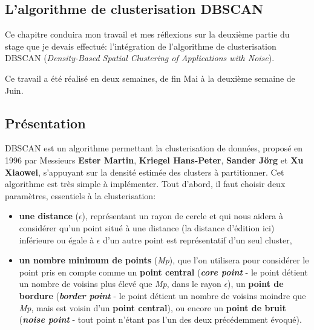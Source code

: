 \documentclass[pdftex,12pt,a4paper]{report}
\begin{document}
\begin{spacing}{1.2}
\chapter{L'algorithme de clusterisation DBSCAN}

Ce chapitre conduira mon travail et mes réflexions sur la deuxième partie du stage que je devais effectué: l'intégration de l'algorithme de clusterisation DBSCAN (\textit{Density-Based Spatial Clustering of Applications with Noise}).

Ce travail a été réalisé en deux semaines, de fin Mai à la deuxième semaine de Juin.

\section{Présentation}

DBSCAN est un algorithme permettant la clusterisation de données, proposé en 1996 par Messieurs \textbf{Ester Martin}, \textbf{Kriegel Hans-Peter}, \textbf{Sander Jörg} et \textbf{Xu Xiaowei}, s'appuyant sur la densité estimée des clusters à partitionner.
Cet algorithme est très simple à implémenter.
\newline
Tout d'abord, il faut choisir deux paramètres, essentiels à la clusterisation:
\begin{itemize}
\item{\textbf{une distance} ($\epsilon$), représentant un rayon de cercle et qui nous aidera à considérer qu'un point situé à une distance (la distance d'édition ici) inférieure ou égale à $\epsilon$ d'un autre point est représentatif d'un seul cluster},
\item{\textbf{un nombre minimum de points} (\textit{Mp}), que l'on utilisera pour considérer le point pris en compte comme un \textbf{point central} (\textit{\textbf{core point}} - le point détient un nombre de voisins plus élevé que \textit{Mp}, dans le rayon $\epsilon$), un \textbf{point de bordure} (\textit{\textbf{border point}} - le point détient un nombre de voisins moindre que \textit{Mp}, mais est voisin d'un \textbf{point central}), ou encore un \textbf{point de bruit} (\textit{\textbf{noise point}} - tout point n'étant pas l'un des deux précédemment évoqué).}
\end{itemize}


\end{spacing}
\end{document}
